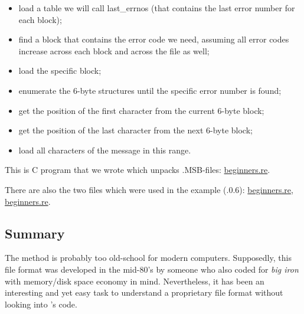 \begin{itemize}
\item load a table we will call last\_errnos (that contains the last error number for each block);

\item find a block that contains the error code we need, assuming all error codes 
increase across each block and across the file as well;

\item load the specific block;

\item enumerate the 6-byte structures until the specific error number is found;

\item get the position of the first character from the current 6-byte block;

\item get the position of the last character from the next 6-byte block;

\item load all characters of the message in this range.
\end{itemize}

This is C program that we wrote which unpacks .MSB-files:
\href{http://go.yurichev.com/17213}{beginners.re}.

There are also the two files which were used in the example 
(.0.6):
\href{http://go.yurichev.com/17214}{beginners.re},
\href{http://go.yurichev.com/17215}{beginners.re}.

\subsection{Summary}

The method is probably too 
old-school for modern computers.
Supposedly, this file format was developed in the mid-80's by 
someone who also coded for \emph{big iron} with
memory/disk space economy in mind.
Nevertheless, it has been an interesting and yet easy task 
to understand a proprietary file format without looking into \oracle's code.
